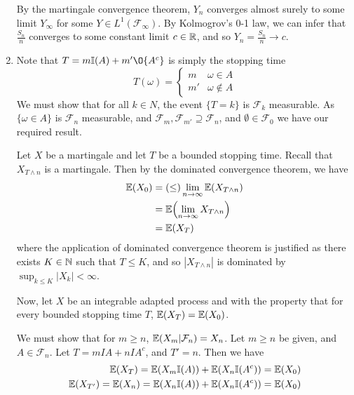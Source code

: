 \begin{enumerate}
  By the martingale convergence theorem, $Y_{n}$ converges almost
  surely to some limit $Y_{\infty}$ for some $Y \in
  L^{1}(\mathcal{F}_{\infty})$.  By Kolmogrov's 0-1 law, we can infer
  that $\frac{S_{n}}{n}$ converges to some constant limit $c \in \mathbb{R}$,
  and so $Y_{n} = \frac{S_{n}}{n} \rightarrow c$.

\item Note that $T = m\I{A} + m'\O{A^{c}}$ is simply the stopping time
  \begin{equation}
    \label{eq:26}
    T(\omega) =
    \begin{cases}
      m & \omega \in A \\
      m' & \omega \notin A
    \end{cases}
  \end{equation}
  We must show that for all $k \in N$, the event $\{ T = k \}$ is
  $\mathcal{F}_{k}$ measurable. As $\{ \omega \in A \}$ is
  $\mathcal{F}_{n}$ measurable, and $\mathcal{F}_{m}, \mathcal{F}_{m'}
  \supseteq \mathcal{F}_{n}$, and $\emptyset \in \mathcal{F}_{0}$ we
  have our required result.

  Let $X$ be a martingale and let $T$ be a bounded stopping time.
  Recall that $X_{T \wedge n}$ is a martingale. Then by the dominated
  convergence theorem, we have
  \begin{align}
    \label{eq:27}
    \E{X_{0}} &= (\leq) \lim_{n \rightarrow \infty} \E{X_{T \wedge n}} \\
    &= \E{\lim_{n \rightarrow \infty} X_{T \wedge n}} \\
    &= \E{X_{T}} 
  \end{align} where the application of dominated convergence
  theorem is justified as there exists $K \in \mathbb{N}$ such that $T \leq
  K$, and so $|X_{T \wedge n}|$ is dominated by $\sup_{k \leq K} |X_{k}| <
  \infty$.

  Now, let $X$ be an integrable adapted process and with the property
  that for every bounded stopping time $T$, $\E{X_{T}} = \E{X_{0}}$.

  We must show that for $m \geq n$, $\E{X_{m} | \mathcal{F}_{n}} =
  X_{n}$. Let $m \geq n$ be given, and $A \in \mathcal{F}_{n}$. Let $T
  = m I{A} + n I{A^{c}}$, and $T' = n$. Then we have
  \begin{align}
    \label{eq:28}
    \E{X_{T}} = \E{X_{m}\I{A}} + \E{X_{n} \I{A^{c}}} = \E{X_{0}} \\
    \E{X_{T'}} = \E{X_{n}} = \E{X_{n} \I{A}} + \E{X_{n} \I{A^{c}}} = \E{X_{0}}
  \end{align}


\end{enumerate}
